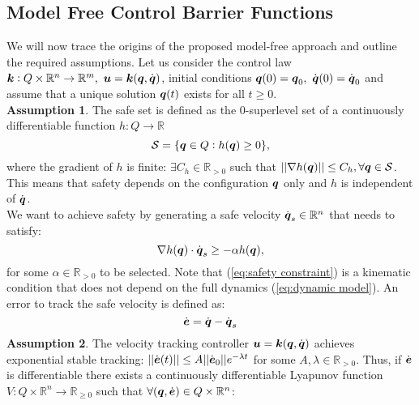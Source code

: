 \subsection{Model Free Control Barrier Functions}
We will now trace the origins of the proposed model-free approach and outline the required assumptions.
Let us consider the control law $ \boldsymbol{k}:Q\times \mathbb{R}^n \rightarrow \mathbb{R}^m,~\boldsymbol{u}=\boldsymbol{k}({\boldsymbol{q}},\dot{\boldsymbol{q}})$, initial conditions ${\boldsymbol{q}}(0) = {\boldsymbol{q}}_0,~\dot{{\boldsymbol{q}}}(0)=\dot{{\boldsymbol{q}}}_0$ and assume that a unique solution ${\boldsymbol{q}}(t)$ exists for all $t \geq 0$. 
\\
\textbf{Assumption 1}. The safe set is defined as the 0-superlevel set of a continuously differentiable function $h: Q \rightarrow \mathbb{R}$
\begin{equation} \label{eq:safe set}
    \mathcal{S} = \{{\boldsymbol{q}} \in Q: h({\boldsymbol{q}})\geq 0 \},
\end{equation}
where the gradient of $h$ is finite: $\exists C_h \in \mathbb{R}_{>0}$ such that $|| \nabla h({\boldsymbol{q}})|| \leq C_h, \forall {\boldsymbol{q}} \in \mathcal{S}$. This means that safety depends on the configuration ${\boldsymbol{q}}$ only and $h$ is independent of $\dot{{\boldsymbol{q}}}$.
\\
We want to achieve safety by generating a safe velocity $\dot{{\boldsymbol{q}}}_s \in \mathbb{R}^n$ that needs to satisfy:
\begin{equation} \label{eq:safety constraint}
    \nabla h({\boldsymbol{q}})\cdot\dot{\boldsymbol{q}}_s \geq -\alpha h({\boldsymbol{q}}),
\end{equation}
for some $\alpha \in \mathbb{R}_{>0}$ to be selected. Note that (\ref{eq:safety constraint}) is a kinematic condition that does not depend on the full dynamics (\ref{eq:dynamic model}).
An error to track the safe velocity is defined as: 
\begin{equation}\label{eq:error}
\dot{\boldsymbol{e}} = \dot{{\boldsymbol{q}}}-\dot{{\boldsymbol{q}}}_s 
\end{equation}
\textbf{Assumption 2}. The velocity tracking controller $\boldsymbol{u} = \boldsymbol{k}({\boldsymbol{q}},\dot{\boldsymbol{q}})$ achieves exponential stable tracking: $||\dot{\boldsymbol{e}}(t)||\leq A ||\dot{\boldsymbol{e}}_0|| e^{-\lambda t}$ for some $A,\lambda \in \mathbb{R}_{>0}$.
 Thus, if $\dot{\boldsymbol{e}}$ is differentiable there exists a continuously differentiable Lyapunov function $V: Q \times \mathbb{R}^n \rightarrow \mathbb{R}_{\geq 0}$ such that $\forall({\boldsymbol{q}},\dot{\boldsymbol{e}})\in Q \times \mathbb{R}^n$:
